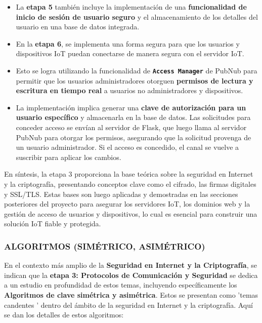 \documentclass{report}
\begin{document}
\begin{itemize}
\begin{itemize}
        \begin{itemize}
            \item La \textbf{etapa 5} también incluye la implementación de una \textbf{funcionalidad de inicio de sesión de usuario seguro} y el 
            almacenamiento de los detalles del usuario en una base de datos integrada.
            \item En la \textbf{etapa 6}, se implementa una forma segura para que los usuarios y dispositivos IoT puedan conectarse de manera segura 
            con el servidor IoT.
            \item Esto se logra utilizando la funcionalidad de \textbf{\texttt{Access Manager}} de PubNub para permitir que los usuarios administradores 
            otorguen \textbf{permisos de lectura y escritura en tiempo real} a usuarios no administradores y dispositivos.
            \item La implementación implica generar una \textbf{clave de autorización para un usuario específico} y almacenarla en la base de datos. 
            Las solicitudes para conceder acceso se envían al servidor de Flask, que luego llama al servidor PubNub para otorgar los permisos, asegurando 
            que la solicitud provenga de un usuario administrador. Si el acceso es concedido, el canal se vuelve a suscribir para aplicar los cambios.
        \end{itemize}
    \end{itemize}
\end{itemize}
En síntesis, la etapa 3 proporciona la base teórica sobre la seguridad en Internet y la criptografía, presentando conceptos clave como el cifrado, 
las firmas digitales y SSL/TLS. Estas bases son luego aplicadas y demostradas en las secciones posteriores del proyecto para asegurar los servidores IoT, 
los dominios web y la gestión de acceso de usuarios y dispositivos, lo cual es esencial para construir una solución IoT fiable y protegida.

\subsubsection{ALGORITMOS (SIMÉTRICO, ASIMÉTRICO)}
En el contexto más amplio de la \textbf{Seguridad en Internet y la Criptografía}, se  indican que la \textbf{etapa 3: Protocolos de Comunicación 
y Seguridad} se dedica a un estudio en profundidad de estos temas, incluyendo específicamente los \textbf{Algoritmos de clave simétrica y asimétrica}. 
Estos se presentan como  'temas candentes ' dentro del ámbito de la seguridad en Internet y la criptografía. Aquí se dan los detalles de estos algoritmos:
\end{document}
